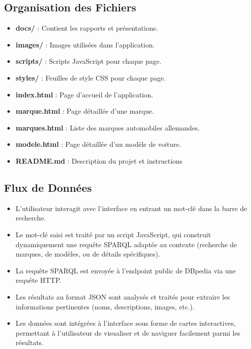 \documentclass[a4paper]{article}
\begin{document}
\subsection{Organisation des Fichiers}
\begin{itemize}
    \item \textbf{docs/} : Contient les rapports et présentations.
    \item \textbf{images/} : Images utilisées dans l'application.
    \item \textbf{scripts/} : Scripts JavaScript pour chaque page.
    \item \textbf{styles/} : Feuilles de style CSS pour chaque page.
    \item \textbf{index.html} : Page d'accueil de l'application.
    \item \textbf{marque.html} : Page détaillée d'une marque.
    \item \textbf{marques.html} : Liste des marques automobiles allemandes.
    \item \textbf{modele.html} : Page détaillée d'un modèle de voiture.
    \item \textbf{README.md} : Description du projet et instructions
\end{itemize}

\subsection{Flux de Données}
\begin{itemize}
    \item L'utilisateur interagit avec l'interface en entrant un mot-clé dans la barre de recherche.
    \item Le mot-clé saisi est traité par un script JavaScript, qui construit dynamiquement une requête SPARQL adaptée au contexte (recherche de marques, de modèles, ou de détails spécifiques).
    \item La requête SPARQL est envoyée à l'endpoint public de DBpedia via une requête HTTP.
    \item Les résultats au format JSON sont analysés et traités pour extraire les informations pertinentes (noms, descriptions, images, etc.).
    \item Les données sont intégrées à l'interface sous forme de cartes interactives, permettant à l'utilisateur de visualiser et de naviguer facilement parmi les résultats.
\end{itemize}
\end{document}
